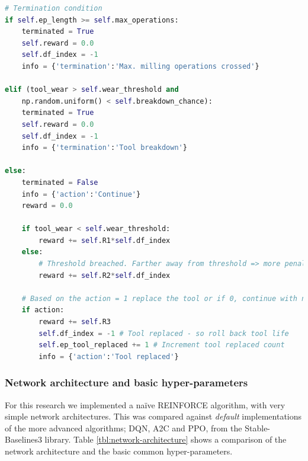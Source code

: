 \documentclass[a4paper, 12pt]{article}
\begin{document}
\begin{lstlisting}[language=Python, label={lst:SSStep}, caption={Environment: Important implementation details of the 'step' function}]
# Termination condition
if self.ep_length >= self.max_operations:
	terminated = True
	self.reward = 0.0
	self.df_index = -1
	info = {'termination':'Max. milling operations crossed'}

elif (tool_wear > self.wear_threshold and 
	np.random.uniform() < self.breakdown_chance):
	terminated = True
	self.reward = 0.0
	self.df_index = -1
	info = {'termination':'Tool breakdown'}

else:
	terminated = False
	info = {'action':'Continue'}
	reward = 0.0
	
	if tool_wear < self.wear_threshold:
		reward += self.R1*self.df_index
	else:
		# Threshold breached. Farther away from threshold => more penalty
		reward += self.R2*self.df_index 
		
	# Based on the action = 1 replace the tool or if 0, continue with normal operation
	if action:
		reward += self.R3 
		self.df_index = -1 # Tool replaced - so roll back tool life
		self.ep_tool_replaced += 1 # Increment tool replaced count
		info = {'action':'Tool replaced'}
\end{lstlisting}

\subsubsection*{Network architecture and basic hyper-parameters}
For this research we implemented a na\"ive REINFORCE algorithm, with very simple network architectures. This was compared against \textit{default} implementations of the more advanced algorithms; DQN, A2C and PPO, from the Stable-Baselines3 library. Table \ref{tbl:network-architecture} shows a comparison of the network architecture and the basic common hyper-parameters.
\end{document}
